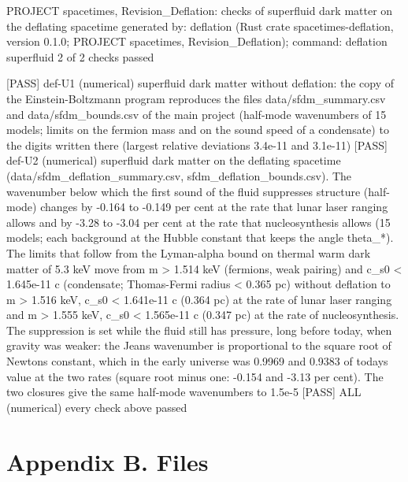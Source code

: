 \documentclass[
  10pt,
]{article}
\newenvironment{Shaded}{}{}
\newcommand{\NormalTok}[1]{#1}
\begin{document}
\begin{Shaded}
\begin{Highlighting}[]
\NormalTok{PROJECT spacetimes, Revision\_Deflation: checks of superfluid dark matter on the deflating spacetime}
\NormalTok{generated by: deflation (Rust crate spacetimes{-}deflation, version 0.1.0; PROJECT spacetimes, Revision\_Deflation); command: deflation superfluid}
\NormalTok{2 of 2 checks passed}

\NormalTok{[PASS] def{-}U1  (numerical) superfluid dark matter without deflation: the copy of the Einstein{-}Boltzmann program reproduces the files data/sfdm\_summary.csv and data/sfdm\_bounds.csv of the main project (half{-}mode wavenumbers of 15 models; limits on the fermion mass and on the sound speed of a condensate) to the digits written there (largest relative deviations 3.4e{-}11 and 3.1e{-}11)}
\NormalTok{[PASS] def{-}U2  (numerical) superfluid dark matter on the deflating spacetime (data/sfdm\_deflation\_summary.csv, sfdm\_deflation\_bounds.csv). The wavenumber below which the first sound of the fluid suppresses structure (half{-}mode) changes by {-}0.164 to {-}0.149 per cent at the rate that lunar laser ranging allows and by {-}3.28 to {-}3.04 per cent at the rate that nucleosynthesis allows (15 models; each background at the Hubble constant that keeps the angle theta\_*). The limits that follow from the Lyman{-}alpha bound on thermal warm dark matter of 5.3 keV move from m \textgreater{} 1.514 keV (fermions, weak pairing) and c\_s0 \textless{} 1.645e{-}11 c (condensate; Thomas{-}Fermi radius \textless{} 0.365 pc) without deflation to m \textgreater{} 1.516 keV, c\_s0 \textless{} 1.641e{-}11 c (0.364 pc) at the rate of lunar laser ranging and m \textgreater{} 1.555 keV, c\_s0 \textless{} 1.565e{-}11 c (0.347 pc) at the rate of nucleosynthesis. The suppression is set while the fluid still has pressure, long before today, when gravity was weaker: the Jeans wavenumber is proportional to the square root of Newton\textquotesingle{}s constant, which in the early universe was 0.9969 and 0.9383 of today\textquotesingle{}s value at the two rates (square root minus one: {-}0.154 and {-}3.13 per cent). The two closures give the same half{-}mode wavenumbers to 1.5e{-}5}
\NormalTok{[PASS] ALL  (numerical) every check above passed}
\end{Highlighting}
\end{Shaded}

\hypertarget{appendix-b.-files}{%
\section{Appendix B. Files}\label{appendix-b.-files}}
\end{document}
